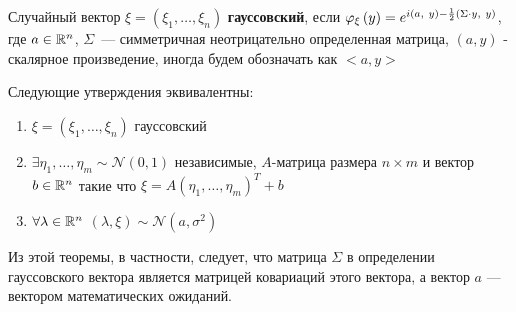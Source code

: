 \begin{definition} Случайный вектор $\xi = (\xi_1, \ldots, \xi_n)$ \textbf{гауссовский}, если $\varphi_{\xi}\left({y}\right) = e^{i(a,\  y) - \frac{1}{2} (\Sigma\cdot y, \  y)}$, где $a \in \mathbb{R}^n$, $\Sigma$~--- симметричная неотрицательно определенная матрица, $(a, y)$ - скалярное произведение, иногда будем обозначать как $<a, y>$
\end{definition}

\begin{theorem} Следующие утверждения эквивалентны:
\begin{enumerate}
    \item $\xi = (\xi_1, \ldots, \xi_n)$ гауссовский
    \item $\exists \eta_1, \ldots, \eta_m \sim \mathcal{N}(0, 1)$ независимые, $A \text{-матрица размера } {n \times m}$ и вектор $b \in \mathbb{R}^n$ такие что $\xi = A(\eta_1, \ldots, \eta_m)^T + b$
    \item $\forall \lambda \in \mathbb{R}^n$ $(\lambda, \xi) \sim \mathcal{N}(a, \sigma^2)$
\end{enumerate}
\end{theorem}
Из этой теоремы, в частности, следует, что матрица $\Sigma$ в определении гауссовского вектора является матрицей ковариаций этого вектора, а вектор $a$ — вектором математических ожиданий.

